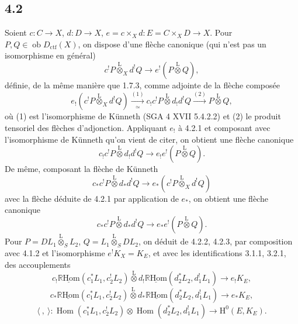 \documentclass[11pt]{article}
\renewcommand{\H}{\mathrm{H}}
\DeclareMathOperator{\Hom}{Hom}
\newcommand{\R}{\mathbb{R}}\newcommand{\RHomCore}{\mathbb{R}\mathrm{Hom}}
\newcommand{\ob}{\operatorname{ob}}
\providecommand{\RHom}{\RHomCore}
\providecommand{\uRHom}{\underline{\RHom}}
\providecommand{\Dctf}{D_{\mathrm{ctf}}}
\providecommand{\Dctf}{D_{\mathrm{ctf}}}
\providecommand{\RHom}{\RHomCore}
\providecommand{\Hom}{\operatorname{Hom}}
\providecommand{\ob}{\operatorname{ob}}
\providecommand{\RHom}{\R\mathcal{H}om}
\providecommand{\R}{\mathrm R}
\providecommand{\RHom}{\RHomCore}
\providecommand{\Hom}{\operatorname{Hom}}
\begin{document}
\subsection*{4.2}
Soient $c:C\to X$, $d:D\to X$, $e=c\times_Xd:E=C\times_XD\to X$. Pour $P,Q\in\ob\Dctf(X)$, on dispose d'une flèche canonique (qui n'est pas un isomorphisme en général)
\begin{equation}
c^!P\overset{\mathrm{L}}{\otimes}_X d^!Q
\longrightarrow e^!(P\overset{\mathrm{L}}{\otimes}Q),
\tag{4.2.1}
\end{equation}
définie, de la
même manière que 1.7.3, comme adjointe de la flèche composée
\[
e_!(c^!P\overset{\mathrm{L}}{\otimes}_X d^!Q)
\xrightarrow[\simeq]{(1)}
 c_!c^!P\overset{\mathrm{L}}{\otimes}d_!d^!Q
\xrightarrow{(2)} P\overset{\mathrm{L}}{\otimes}Q,
\]
où (1) est l'isomorphisme de Künneth (SGA 4 XVII 5.4.2.2) et (2) le produit tensoriel des flèches d'adjonction. Appliquant $e_!$ à 4.2.1 et composant avec l'isomorphisme de Künneth qu'on vient de citer, on obtient une flèche canonique
\begin{equation}
c_!c^!P\overset{\mathrm{L}}{\otimes}d_!d^!Q
\longrightarrow e_!e^!(P\overset{\mathrm{L}}{\otimes}Q).
\tag{4.2.2}
\end{equation}
De même, composant la flèche de Künneth
\[
c_*c^!P\overset{\mathrm{L}}{\otimes}d_*d^!Q
\longrightarrow e_*(c^!P\overset{\mathrm{L}}{\otimes}_X d^!Q)
\]
avec la flèche déduite de 4.2.1 par application de $e_*$, on obtient une flèche canonique
\begin{equation}
c_*c^!P\overset{\mathrm{L}}{\otimes}d_*d^!Q
\longrightarrow e_*e^!(P\overset{\mathrm{L}}{\otimes}Q).
\tag{4.2.3}
\end{equation}
Pour $P=DL_1\overset{\mathrm{L}}{\otimes}_S L_2$, $Q=L_1\overset{\mathrm{L}}{\otimes}_S DL_2$, on déduit de 4.2.2, 4.2.3, par composition avec 4.1.2 et l'isomorphisme $e^!K_X=K_E$, et avec les identifications 3.1.1, 3.2.1, des accouplements
\begin{equation}
c_!\uRHom(c_1^*L_1,c_2^!L_2)\overset{\mathrm{L}}{\otimes}
 d_!\uRHom(d_2^*L_2,d_1^!L_1)
\longrightarrow e_!K_E,
\tag{4.2.4}
\end{equation}
\begin{equation}
c_*\uRHom(c_1^*L_1,c_2^!L_2)\overset{\mathrm{L}}{\otimes}
 d_*\uRHom(d_2^*L_2,d_1^!L_1)
\longrightarrow e_*K_E,
\tag*{(4.2.4)'}
\end{equation}
\begin{equation}
\langle\ ,\ \rangle:
\Hom(c_1^*L_1,c_2^!L_2)\otimes\Hom(d_2^*L_2,d_1^!L_1)
\longrightarrow \H^0(E,K_E).
\tag{4.2.5}
\end{equation}
\end{document}
